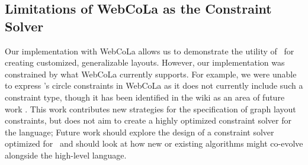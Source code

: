 
\subsection{Limitations of WebCoLa as the Constraint Solver}




Our implementation with WebCoLa allows us to demonstrate the utility of
\projectname~for creating customized, generalizable layouts. However, our
implementation was constrained by what WebCoLa currently supports. For
example, we were unable to express \projectname's circle constraints in
WebCoLa as it does not currently include such a constraint type, though it
has been identified in the wiki as an area of future work
. This work contributes new strategies for the
specification of graph layout constraints, but does not aim to create a
highly optimized constraint solver for the language; Future work should
explore the design of a constraint solver optimized for \projectname~and
should look at how new or existing algorithms might co-evolve alongside the
high-level language.



